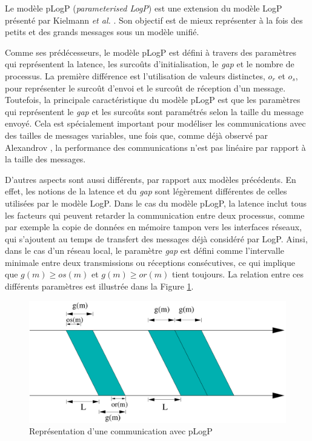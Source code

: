 Le modèle pLogP (\emph{parameterised LogP}) est une extension
du modèle LogP présenté par Kielmann \emph{et al.} \cite{Kielmann01}. Son objectif est de 
mieux représenter à la fois des petits et des grands messages sous un modèle unifié. 

Comme ses prédécesseurs, le modèle pLogP est défini à travers des
paramètres qui représentent la latence, les surcoûts d'initialisation,
le \emph{gap} et le nombre de processus. La première différence est
l'utilisation de valeurs distinctes, $o_{r}$ et $o_{s}$, pour représenter
le surcoût d'envoi et le surcoût de réception d'un message. Toutefois,
la principale caractéristique du modèle pLogP est que les paramètres
qui représentent le \emph{gap} et les surcoûts sont paramétrés selon
la taille du message envoyé. Cela est spécialement important pour
modéliser les communications avec des tailles de messages variables,
une fois que, comme déjà observé par Alexandrov \cite{Alexandrov95},
la performance des communications n'est pas linéaire par rapport à
la taille des messages.

D'autres aspects sont aussi différents, par rapport aux modèles précédents.
En effet, les notions de la latence et du \emph{gap} sont légèrement
différentes de celles utilisées par le modèle LogP. Dans le
cas du modèle pLogP, la latence inclut tous les facteurs qui peuvent
retarder la communication entre deux processus, comme par exemple
la copie de données en mémoire tampon vers les interfaces réseaux,
qui s'ajoutent au temps de transfert des messages déjà considéré par
LogP. Ainsi, dans le cas d'un réseau local, le paramètre \emph{gap}
est défini comme l'intervalle minimale entre deux transmissions ou
réceptions consécutives, ce qui implique que $g(m)\geq os(m)$ et
$g(m)\geq or(m)$ tient toujours. La relation entre ces différents
paramètres est illustrée dans la Figure \ref{Figure: pLogP}. 

%
\begin{figure}[h]
\centering
\includegraphics[width=0.7\linewidth]{images/p2p/plogp-struct}

\caption{\label{Figure: pLogP}Représentation d'une communication avec pLogP}

\end{figure}


